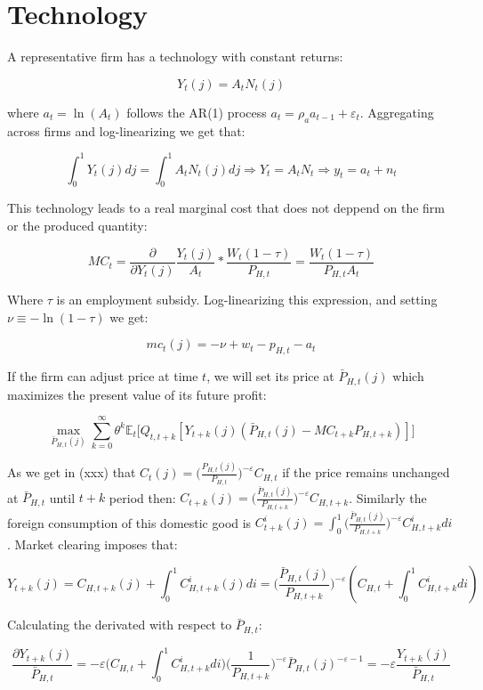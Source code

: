 \documentclass{article}
\newcommand{\Et}{\mathbb{E}_t}
\begin{document}
\section{Technology}

A representative firm has a technology with constant returns:

$$Y_t(j) = A_t N_t(j)$$

where $a_t = \ln(A_t)$ follows the AR(1) process $a_t = \rho_a a_{t-1} + \varepsilon_t$. Aggregating across firms and log-linearizing we get that:

$$\int^1_0 Y_t(j) dj = \int^1_0 A_t N_t(j) dj \Rightarrow Y_t = A_t N_t \Rightarrow y_t = a_t + n_t$$

This technology leads to a real marginal cost that does not deppend on the firm or the produced quantity:

$$MC_t = \frac{\partial}{\partial Y_t(j)} \frac{Y_t(j)}{A_t} * \frac{W_t(1-\tau)}{P_{H,t}} =\frac{W_t(1-\tau)}{P_{H,t} A_t}$$

Where $\tau$ is an employment subsidy. Log-linearizing this expression, and setting $\nu \equiv -\ln(1-\tau)$ we get:

$$mc_t(j) = -\nu + w_t - p_{H,t} - a_t$$

If the firm can adjust price at time $t$, we will set its price at $\bar P_{H,t} (j)$ which maximizes the present value of its future profit:

$$\max_{\bar P_{H,t}(j)} \sum^\infty_{k=0} \theta^k \Et \big[ Q_{t, t+k}[Y_{t+k}(j) (\bar P_{H,t}(j) - MC_{t+k} P_{H,t+k})] \big]$$


As we get in (xxx) that $C_t(j) = \Big( \frac{P_{H,t}(j)}{P_{H,t}} \Big)^{-\varepsilon} C_{H, t}$ if the price remains unchanged at $\bar P_{H,t}$ until $t+k$ period then: $C_{t+k}(j) = \Big( \frac{\bar P_{H,t}(j)}{P_{H,t+k}}\Big)^{-\varepsilon} C_{H, t+k}$. Similarly the foreign consumption of this domestic good is $C^i_{t+k}(j) = \int^1_0 \Big( \frac{\bar P_{H,t}(j)}{P_{H,t+k}} \Big)^{-\varepsilon} C^i_{H, t+k} di$. Market clearing imposes that:

$$Y_{t+k}(j) = C_{H,t+k}(j) + \int_0^1 C^i_{H, t+k}(j) di = \bigg( \frac{\bar P_{H,t}(j)}{P_{H,t+k}} \bigg)^{-\varepsilon} (C_{H,t} +  \int_0^1 C^i_{H, t+k} di)$$

Calculating the derivated with respect to $\bar P_{H,t}$:

$$\frac{\partial Y_{t+k}(j)}{\bar P_{H,t}} = -\varepsilon \bigg(C_{H,t} +  \int_0^1 C^i_{H, t+k} di \bigg)  \bigg( \frac{1}{P_{H,t+k}}  \bigg)^{-\varepsilon} \bar P_{H,t}(j)^{-\varepsilon -1} = - \varepsilon \frac{Y_{t+k}(j)}{\bar P_{H,t}}$$
\end{document}
